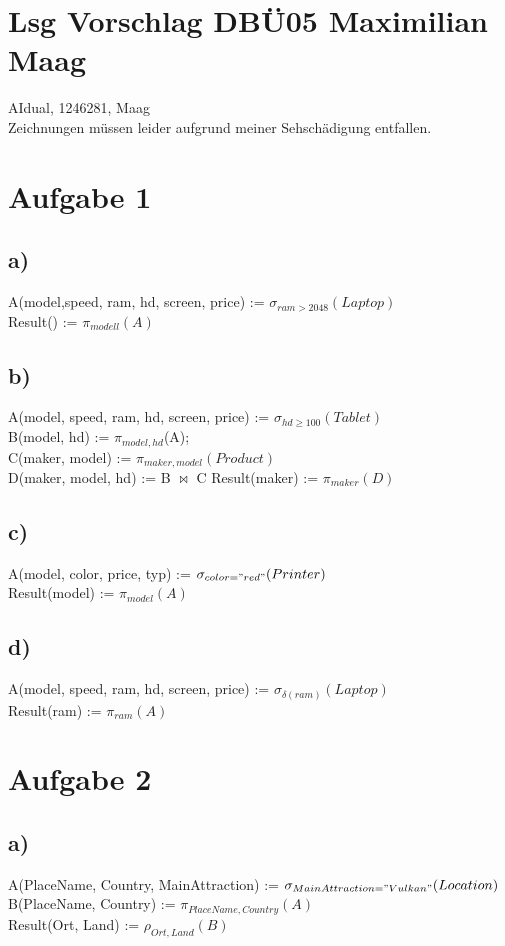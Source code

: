 \documentclass{article}
\begin{document}
	
	\section*{Lsg Vorschlag DBÜ05 Maximilian Maag}
	AIdual, 1246281, Maag \\
	Zeichnungen müssen leider aufgrund meiner Sehschädigung entfallen.
	\section*{Aufgabe 1}
	\subsection*{a)}
	A(model,speed, ram, hd, screen, price) := $\sigma_{ram>2048}(Laptop)$ \\
	Result() := $\pi_{modell}(A)$
	\subsection*{b)}
	A(model, speed, ram, hd, screen, price) := $\sigma_{hd\geq100}(Tablet)$ \\
	B(model, hd) := $\pi_{model, hd}$(A); \\
	C(maker, model) := $\pi_{maker, model}(Product)$ \\
	D(maker, model, hd) := B $\bowtie$ C
	Result(maker) := $\pi_{maker}(D)$
	\subsection*{c)}
	A(model, color, price, typ) := $\sigma_{color="red"}(Printer)$ \\
	Result(model) :=  $\pi_{model}(A)$
	\subsection*{d)}
	A(model, speed, ram, hd, screen, price) := $\sigma_{\delta(ram)}(Laptop)$ \\
	Result(ram) := $\pi_{ram}(A)$
	\section*{Aufgabe 2}
	\subsection*{a)}
	A(PlaceName, Country, MainAttraction) := $\sigma_{MainAttraction = "Vulkan"}(Location)$ \\
	B(PlaceName, Country) := $\pi_{PlaceName, Country}(A)$ \\
	Result(Ort, Land) := $\rho_{Ort, Land}(B)$
\end{document}
